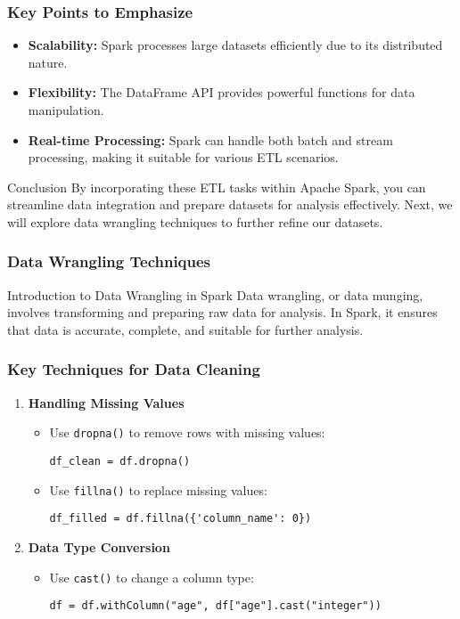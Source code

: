 \documentclass[aspectratio=169]{beamer}
\begin{document}
\begin{frame}
    \frametitle{Key Points to Emphasize}
    \begin{itemize}
        \item \textbf{Scalability:} Spark processes large datasets efficiently due to its distributed nature.
        \item \textbf{Flexibility:} The DataFrame API provides powerful functions for data manipulation.
        \item \textbf{Real-time Processing:} Spark can handle both batch and stream processing, making it suitable for various ETL scenarios.
    \end{itemize}
    
    \begin{block}{Conclusion}
        By incorporating these ETL tasks within Apache Spark, you can streamline data integration and prepare datasets for analysis effectively. 
        Next, we will explore data wrangling techniques to further refine our datasets.
    \end{block}
\end{frame}

\begin{frame}[fragile]
    \frametitle{Data Wrangling Techniques}
    \begin{block}{Introduction to Data Wrangling in Spark}
        Data wrangling, or data munging, involves transforming and preparing raw data for analysis. In Spark, it ensures that data is accurate, complete, and suitable for further analysis.
    \end{block}
\end{frame}

\begin{frame}[fragile]
    \frametitle{Key Techniques for Data Cleaning}
    \begin{enumerate}
        \item \textbf{Handling Missing Values}
        \begin{itemize}
            \item Use \texttt{dropna()} to remove rows with missing values:
            \begin{lstlisting}
df_clean = df.dropna()
            \end{lstlisting}
            \item Use \texttt{fillna()} to replace missing values:
            \begin{lstlisting}
df_filled = df.fillna({'column_name': 0})
            \end{lstlisting}
        \end{itemize}
        
        \item \textbf{Data Type Conversion}
        \begin{itemize}
            \item Use \texttt{cast()} to change a column type:
            \begin{lstlisting}
df = df.withColumn("age", df["age"].cast("integer"))
            \end{lstlisting}
        \end{itemize}
    \end{enumerate}
\end{frame}
\end{document}
